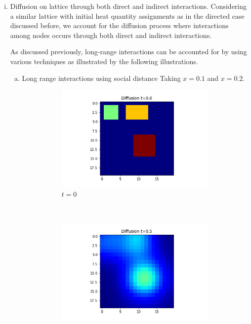 \documentclass[10pt,a4paper]{article}
\begin{document}
\begin{enumerate}[i)]
         	\item Diffusion on lattice through both direct and indirect interactions.
         	Considering a similar lattice with initial heat quantity assignments as in the directed case discussed before, we account for the diffusion process where interactions among nodes occurs through both direct and indirect interactions.
         	
         	As discussed previously, long-range interactions can be accounted for by using various techniques as illustrated by the following illustrations.
         	\begin{enumerate}[a)]
         		\item Long range interactions using social distance 
         		Taking $x=0.1$ and $x=0.2$.
         		\begin{figure}[!h]
         			\centering
         			\begin{subfigure}[b]{0.25\textwidth}
         				\includegraphics[width=\textwidth]{images/grid-t0-x01.png}
         				\caption{$t=0$}
         				\label{gridt0x01}
         			\end{subfigure}~
         			\begin{subfigure}[b]{0.25\textwidth}
         				\includegraphics[width= \textwidth]{images/grid-t05-x01.png}

\end{subfigure}
\end{figure}
\end{enumerate}
\end{enumerate}
\end{document}
